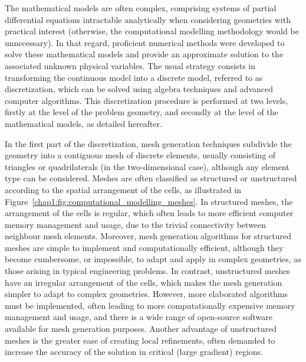 The mathematical models are often complex, comprising systems of partial differential equations intractable analytically when considering geometries with practical interest (otherwise, the computational modelling methodology would be unnecessary).
In that regard, proficient numerical methods were developed to solve these mathematical models and provide an approximate solution to the associated unknown physical variables.
The usual strategy consists in transforming the continuous model into a discrete model, referred to as discretization, which can be solved using algebra techniques and advanced computer algorithms.
This discretization procedure is performed at two levels, firstly at the level of the problem geometry, and secondly at the level of the mathematical models, as detailed hereafter.

In the first part of the discretization, mesh generation techniques subdivide the geometry into a contiguous mesh of discrete elements, usually consisting of triangles or quadrilaterals (in the two-dimensional case), although any element type can be considered.
Meshes are often classified as structured or unstructured according to the spatial arrangement of the cells, as illustrated in Figure~\ref{chap1:fig:computational_modelling_meshes}.
In structured meshes, the arrangement of the cells is regular, which often leads to more efficient computer memory management and usage, due to the trivial connectivity between neighbour mesh elements.
Moreover, mesh generation algorithms for structured meshes are simple to implement and computationally efficient, although they become cumbersome, or impossible, to adapt and apply in complex geometries, as those arising in typical engineering problems.
In contrast, unstructured meshes have an irregular arrangement of the cells, which makes the mesh generation simpler to adapt to complex geometries.
However, more elaborated algorithms must be implemented, often leading to more computationally expensive memory management and usage, and there is a wide range of open-source software available for mesh generation purposes.
Another advantage of unstructured meshes is the greater ease of creating local refinements, often demanded to increase the accuracy of the solution in critical (large gradient) regions.

